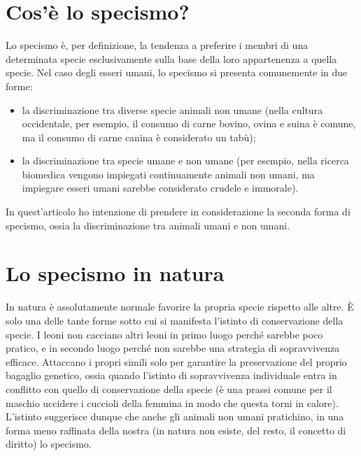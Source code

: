 \documentclass[a4paper,11pt,oneside,article]{memoir}
\begin{document}
\chapter{Cos'è lo specismo?}

Lo specismo è, per definizione, la tendenza a preferire i membri di una
determinata specie esclusivamente sulla base della loro appartenenza a quella
specie. Nel caso degli esseri umani, lo specismo si presenta comunemente in due
forme:

\begin{itemize}

\item la discriminazione tra diverse specie animali non umane (nella cultura
occidentale, per esempio, il consumo di carne bovino, ovina e suina è comune, ma
il consumo di carne canina è considerato un tabù);

\item la discriminazione tra specie umane e non umane (per esempio, nella
ricerca biomedica vengono impiegati continuamente animali non umani, ma
impiegare esseri umani sarebbe considerato crudele e immorale).

\end{itemize}

In quest'articolo ho intenzione di prendere in considerazione la seconda forma
di specismo, ossia la discriminazione tra animali umani e non umani.

\chapter{Lo specismo in natura}

In natura è assolutamente normale favorire la propria specie rispetto alle
altre. È solo una delle tante forme sotto cui si manifesta l'istinto di
conservazione della specie. I leoni non cacciano altri leoni in primo luogo
perché sarebbe poco pratico, e in secondo luogo perché non sarebbe una strategia
di sopravvivenza efficace. Attaccano i propri simili solo per garantire la
preservazione del proprio bagaglio genetico, ossia quando l'istinto di
sopravvivenza individuale entra in conflitto con quello di conservazione della
specie (è una prassi comune per il maschio uccidere i cuccioli della femmina in
modo che questa torni in calore). L'istinto suggerisce dunque che anche gli
animali non umani pratichino, in una forma meno raffinata della nostra (in
natura non esiste, del resto, il concetto di diritto) lo specismo.
\end{document}
